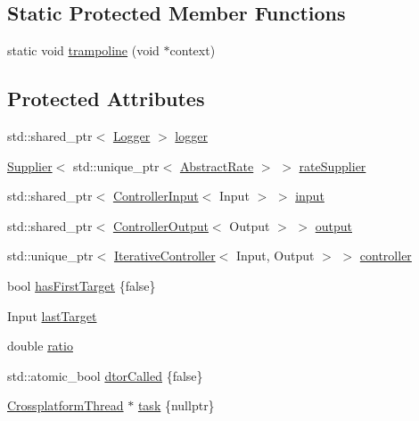 \subsection*{Static Protected Member Functions}
\begin{DoxyCompactItemize}
\item 
static void \mbox{\hyperlink{classokapi_1_1AsyncWrapper_aa947c53d1f595ae6526f996da9b77ca9}{trampoline}} (void $\ast$context)
\end{DoxyCompactItemize}
\subsection*{Protected Attributes}
\begin{DoxyCompactItemize}
\item 
std\+::shared\+\_\+ptr$<$ \mbox{\hyperlink{classokapi_1_1Logger}{Logger}} $>$ \mbox{\hyperlink{classokapi_1_1AsyncWrapper_a9b55140b9c8b7cab105959a7667038ff}{logger}}
\item 
\mbox{\hyperlink{classokapi_1_1Supplier}{Supplier}}$<$ std\+::unique\+\_\+ptr$<$ \mbox{\hyperlink{classokapi_1_1AbstractRate}{Abstract\+Rate}} $>$ $>$ \mbox{\hyperlink{classokapi_1_1AsyncWrapper_ad758e3e7e99f65dc9f2c97312a6e7483}{rate\+Supplier}}
\item 
std\+::shared\+\_\+ptr$<$ \mbox{\hyperlink{classokapi_1_1ControllerInput}{Controller\+Input}}$<$ Input $>$ $>$ \mbox{\hyperlink{classokapi_1_1AsyncWrapper_a96e7029482813dd1277cc7e45c149938}{input}}
\item 
std\+::shared\+\_\+ptr$<$ \mbox{\hyperlink{classokapi_1_1ControllerOutput}{Controller\+Output}}$<$ Output $>$ $>$ \mbox{\hyperlink{classokapi_1_1AsyncWrapper_a7bbdffe660513797a479cb22018fd7bf}{output}}
\item 
std\+::unique\+\_\+ptr$<$ \mbox{\hyperlink{classokapi_1_1IterativeController}{Iterative\+Controller}}$<$ Input, Output $>$ $>$ \mbox{\hyperlink{classokapi_1_1AsyncWrapper_a0a6e4e3e58a885ce74a2d0f729f679c3}{controller}}
\item 
bool \mbox{\hyperlink{classokapi_1_1AsyncWrapper_a75812fac3f252bf5e8d3d4e466d085b8}{has\+First\+Target}} \{false\}
\item 
Input \mbox{\hyperlink{classokapi_1_1AsyncWrapper_ac5fe1a784c27377eb80a995fb229a349}{last\+Target}}
\item 
double \mbox{\hyperlink{classokapi_1_1AsyncWrapper_a2fbcaacada8d9de5111d7c420a4a4635}{ratio}}
\item 
std\+::atomic\+\_\+bool \mbox{\hyperlink{classokapi_1_1AsyncWrapper_aae007010b0b30b530f0b468ebe1d2aef}{dtor\+Called}} \{false\}
\item 
\mbox{\hyperlink{classCrossplatformThread}{Crossplatform\+Thread}} $\ast$ \mbox{\hyperlink{classokapi_1_1AsyncWrapper_a8956664e9b8e52e9437a9129df141d5b}{task}} \{nullptr\}
\end{DoxyCompactItemize}


